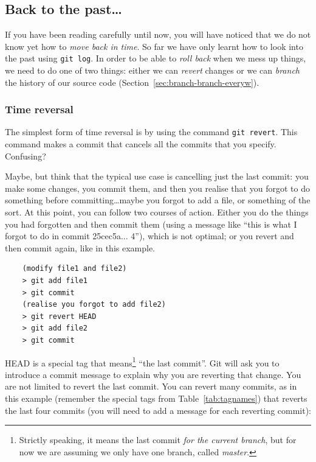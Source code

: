 \subsection{Back to the past\ldots}
\label{sec:branching}

If you have been reading carefully until now, you will have noticed
that we do not know yet how to \emph{move back in time}. So far we
have only learnt how to look into the past using \verb+git log+. In
order to be able to \emph{roll back} when we mess up things, we need
to do one of two things: either we can \emph{revert} changes or we can
\emph{branch} the history of our source code
(Section~\ref{sec:branch-branch-everyw}).

\subsubsection{Time reversal}
\label{sec:time-reversal}

The simplest form of time reversal is by using the command 
\verb+git revert+. This command makes a commit 
that cancels all the commits that
you specify. Confusing? 

Maybe, but think that the typical use case is cancelling just the last
commit: you make some changes, you commit them, and then you realise
that you forgot to do something before committing\ldots maybe you
forgot to add a file, or something of the sort. At this point, you can
follow two courses of action. Either you do the things you had
forgotten and then commit them (using a message like ``this is what I
forgot to do in commit 25cec5a... 4''), which is not optimal; or you
revert and then commit again, like in this example.

\begin{verbatim}
    (modify file1 and file2)
    > git add file1
    > git commit 
    (realise you forgot to add file2)
    > git revert HEAD
    > git add file2
    > git commit
\end{verbatim}

HEAD is a special tag that means\footnote{Strictly speaking, it means
  the last commit \emph{for the current branch}, but for now we are
  assuming we only have one branch, called \emph{master}.} ``the last
commit''. Git will ask you 
to introduce a commit message to explain why you are reverting that
change. You are not limited to revert the last commit. You can revert
many commits, as in this example (remember the special tags from
Table~\ref{tab:tagnames}) that reverts the last four commits 
(you will need to add a message for each reverting commit): 

